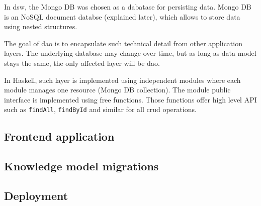In \gls{dsw}, the Mongo DB was chosen as a dabatase for persisting data.
Mongo DB is an NoSQL document databse (explained later), which allows to store data using nested structures.

The goal of \gls{dao} is to encapsulate such technical detail from other application layers.
The underlying database may change over time, but as long as data model stays the same, the only affected layer will be \gls{dao}.

In Haskell, such layer is implemented using independent modules where each module manages one resource (Mongo DB collection).
The module public interface is implemented using free functions.
Those functions offer high level API such as \texttt{findAll}, \texttt{findById} and similar for all \gls{crud} operations.



\subsection{Frontend application}


\subsection{Knowledge model migrations}

\subsection{Deployment}
